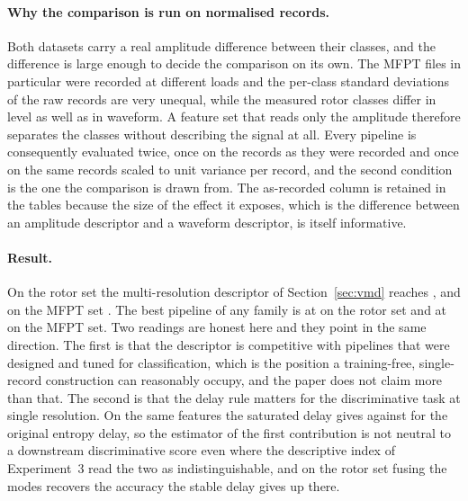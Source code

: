 \documentclass[10pt,a4paper,twocolumn]{article}
\begin{document}
\paragraph{Why the comparison is run on normalised records.}
Both datasets carry a real amplitude difference between their classes, and the
difference is large enough to decide the comparison on its own.  The
MFPT files in particular were recorded at different loads and the per-class
standard deviations of the raw records are very unequal, while the measured
rotor classes differ in level as well as in waveform.  A feature set that
reads only the amplitude therefore separates the classes without describing
the signal at all.  Every pipeline is consequently evaluated twice, once on the
records as they were recorded and once on the same records scaled to unit
variance per record, and the second condition is the one the comparison is
drawn from.  The as-recorded column is retained in the tables because the size
of the effect it exposes, which is the difference between an amplitude
descriptor and a waveform descriptor, is itself informative.

\paragraph{Result.}
On the rotor set the multi-resolution descriptor of Section~\ref{sec:vmd}
reaches \clsRotorHgMr{}, and on the MFPT set \clsMfptHgMr{}.  The best pipeline
of any family is \clsRotorBestName{} at \clsRotorBest{} on the rotor set and
\clsMfptBestName{} at \clsMfptBest{} on the MFPT set.  Two readings are honest
here and they point in the same direction.  The first is that the descriptor is
competitive with pipelines that were designed and tuned for classification,
which is the position a training-free, single-record construction can
reasonably occupy, and the paper does not claim more than that.  The second is
that the delay rule matters for the discriminative task at single resolution.
On the same features the saturated delay gives \clsRotorHg{} against
\clsRotorHgSE{} for the original entropy delay, so the estimator of the first
contribution is not neutral to a downstream discriminative score even where the
descriptive index of Experiment~3 read the two as indistinguishable, and on the
rotor set fusing the modes recovers the accuracy the stable delay gives up
there.

\begin{table}[t]
\centering
\caption{Classification comparison against mainstream fault-diagnosis feature
pipelines.  One fixed classifier backbone per column, three classifiers in all,
stratified cross-validation on the amplitude-normalised records.  The four
hypergraph rows are the representation proposed here, the first of them the
full multi-resolution framework of Section~\ref{sec:vmd} and the next three the
single-resolution descriptor under each delay rule.}
\label{tab:cls}
\scriptsize

\end{table}
\end{document}
